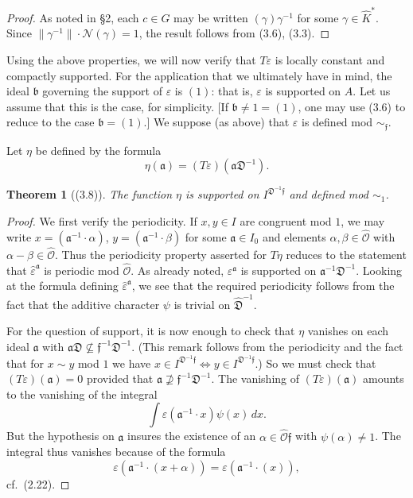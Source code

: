 \documentclass[12pt,a4paper]{article}
\theoremstyle{plain}
\newtheorem{theorem}{Theorem}[section]
\theoremstyle{definition}
\newcommand{\OO}{\mathcal{O}}
\newcommand{\DD}{\mathfrak{D}}
\newcommand{\ff}{\mathfrak{f}}
\begin{document}
\begin{proof}
As noted in \S2, each $c\in G$ may be written $(\gamma)\gamma^{-1}$ for some $\gamma\in\hat{K}^*$. Since $\|\gamma^{-1}\|\cdot\mathcal{N}(\gamma)=1$, the result follows from (3.6), (3.3).
\end{proof}

Using the above properties, we will now verify that $T\varepsilon$ is locally constant and compactly supported. For the application that we ultimately have in mind, the ideal $\mathfrak{b}$ governing the support of $\varepsilon$ is $(1)$: that is, $\varepsilon$ is supported on $A$. Let us assume that this is the case, for simplicity. [If $\mathfrak{b}\neq1=(1)$, one may use (3.6) to reduce to the case $\mathfrak{b}=(1)$.] We suppose (as above) that $\varepsilon$ is defined mod $\sim_{\ff}$.

Let $\eta$ be defined by the formula
\[
\eta(\mathfrak{a})=(T\varepsilon)(\mathfrak{a}\DD^{-1}).
\]

\begin{theorem}[(3.8)]\label{thm:support}
The function $\eta$ is supported on $I^{\DD^{-1}\ff}$ and defined mod $\sim_{1}$.
\end{theorem}

\begin{proof}
We first verify the periodicity. If $x,y\in I$ are congruent mod $1$, we may write $x=(\mathfrak{a}^{-1}\cdot\alpha)$, $y=(\mathfrak{a}^{-1}\cdot\beta)$ for some $\mathfrak{a}\in I_0$ and elements $\alpha,\beta\in\hat{\OO}$ with $\alpha-\beta\in\hat{\OO}$. Thus the periodicity property asserted for $T\eta$ reduces to the statement that $\hat{\varepsilon}^{\mathfrak{a}}$ is periodic mod $\hat{\OO}$. As already noted, $\varepsilon^{\mathfrak{a}}$ is supported on $\mathfrak{a}^{-1}\DD^{-1}$. Looking at the formula defining $\hat{\varepsilon}^{\mathfrak{a}}$, we see that the required periodicity follows from the fact that the additive character $\psi$ is trivial on $\hat{\DD}^{-1}$.

For the question of support, it is now enough to check that $\eta$ vanishes on each ideal $\mathfrak{a}$ with $\mathfrak{a}\DD\not\subseteq\ff^{-1}\DD^{-1}$. (This remark follows from the periodicity and the fact that for $x\sim y$ mod $1$ we have $x\in I^{\DD^{-1}\ff}\iff y\in I^{\DD^{-1}\ff}$.) So we must check that $(T\varepsilon)(\mathfrak{a})=0$ provided that $\mathfrak{a}\not\supseteq\ff^{-1}\DD^{-1}$. The vanishing of $(T\varepsilon)(\mathfrak{a})$ amounts to the vanishing of the integral
\[
\int\varepsilon(\mathfrak{a}^{-1}\cdot x)\psi(x)\,dx.
\]
But the hypothesis on $\mathfrak{a}$ insures the existence of an $\alpha\in\hat{\OO}\ff$ with $\psi(\alpha)\neq1$. The integral thus vanishes because of the formula
\[
\varepsilon(\mathfrak{a}^{-1}\cdot(x+\alpha))=\varepsilon(\mathfrak{a}^{-1}\cdot(x)),
\]
cf.~(2.22).
\end{proof}
\end{document}
